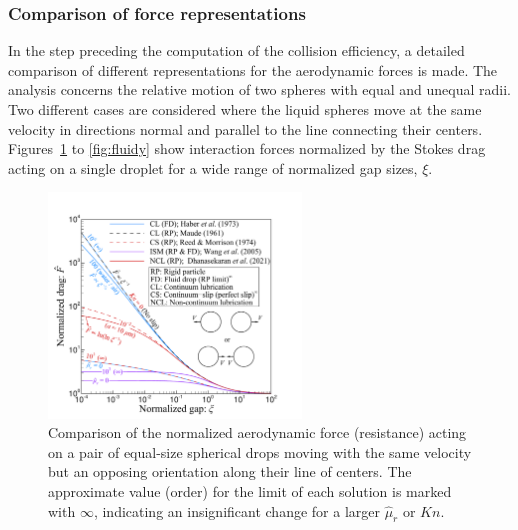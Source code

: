 \documentclass[../thesis.tex]{subfiles}
\begin{document}
\subsubsection{Comparison of force representations}%
In the step preceding the computation of the collision efficiency, a detailed comparison of different representations for the aerodynamic forces is made. The analysis concerns the relative motion of two spheres with equal and unequal radii. Two different cases are considered where the liquid spheres move at the same velocity in directions normal and parallel to the line connecting their centers. Figures~\ref{fig:models} to \ref{fig:fluidy} show interaction forces normalized by the Stokes drag acting on a single droplet for a wide range of normalized gap sizes, $\xi$.
\begin{figure}%
\center
\includegraphics[trim=05mm 00mm 20mm 15mm, clip, width=0.6\textwidth]{../figs/PRF/fig3.pdf}
\caption{Comparison of the normalized aerodynamic force (resistance) acting on a pair of equal-size spherical drops moving with the same velocity but an opposing orientation along their line of centers. The approximate value (order) for the limit of each solution is marked with $\infty$, indicating an insignificant change for a larger $\hat{\mu}_r$ or $Kn$.}
\label{fig:models}
\end{figure}%
\end{document}
